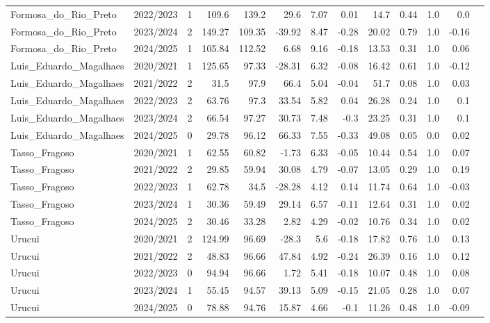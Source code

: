 \begin{longtable}{lrrrrrrrrrrrr}
Formosa_do_Rio_Preto & 2022/2023 & 1 & 109.6 & 139.2 & 29.6 & 7.07 & 0.01 & 14.7 & 0.44 & 1.0 & 0.0 \\ 
Formosa_do_Rio_Preto & 2023/2024 & 2 & 149.27 & 109.35 & -39.92 & 8.47 & -0.28 & 20.02 & 0.79 & 1.0 & -0.16 \\ 
Formosa_do_Rio_Preto & 2024/2025 & 1 & 105.84 & 112.52 & 6.68 & 9.16 & -0.18 & 13.53 & 0.31 & 1.0 & 0.06 \\ 
Luis_Eduardo_Magalhaes & 2020/2021 & 1 & 125.65 & 97.33 & -28.31 & 6.32 & -0.08 & 16.42 & 0.61 & 1.0 & -0.12 \\ 
Luis_Eduardo_Magalhaes & 2021/2022 & 2 & 31.5 & 97.9 & 66.4 & 5.04 & -0.04 & 51.7 & 0.08 & 1.0 & 0.03 \\ 
Luis_Eduardo_Magalhaes & 2022/2023 & 2 & 63.76 & 97.3 & 33.54 & 5.82 & 0.04 & 26.28 & 0.24 & 1.0 & 0.1 \\ 
Luis_Eduardo_Magalhaes & 2023/2024 & 2 & 66.54 & 97.27 & 30.73 & 7.48 & -0.3 & 23.25 & 0.31 & 1.0 & 0.1 \\ 
Luis_Eduardo_Magalhaes & 2024/2025 & 0 & 29.78 & 96.12 & 66.33 & 7.55 & -0.33 & 49.08 & 0.05 & 0.0 & 0.02 \\ 
Tasso_Fragoso & 2020/2021 & 1 & 62.55 & 60.82 & -1.73 & 6.33 & -0.05 & 10.44 & 0.54 & 1.0 & 0.07 \\ 
Tasso_Fragoso & 2021/2022 & 2 & 29.85 & 59.94 & 30.08 & 4.79 & -0.07 & 13.05 & 0.29 & 1.0 & 0.19 \\ 
Tasso_Fragoso & 2022/2023 & 1 & 62.78 & 34.5 & -28.28 & 4.12 & 0.14 & 11.74 & 0.64 & 1.0 & -0.03 \\ 
Tasso_Fragoso & 2023/2024 & 1 & 30.36 & 59.49 & 29.14 & 6.57 & -0.11 & 12.64 & 0.31 & 1.0 & 0.02 \\ 
Tasso_Fragoso & 2024/2025 & 2 & 30.46 & 33.28 & 2.82 & 4.29 & -0.02 & 10.76 & 0.34 & 1.0 & 0.02 \\ 
Urucui & 2020/2021 & 2 & 124.99 & 96.69 & -28.3 & 5.6 & -0.18 & 17.82 & 0.76 & 1.0 & 0.13 \\ 
Urucui & 2021/2022 & 2 & 48.83 & 96.66 & 47.84 & 4.92 & -0.24 & 26.39 & 0.16 & 1.0 & 0.12 \\ 
Urucui & 2022/2023 & 0 & 94.94 & 96.66 & 1.72 & 5.41 & -0.18 & 10.07 & 0.48 & 1.0 & 0.08 \\ 
Urucui & 2023/2024 & 1 & 55.45 & 94.57 & 39.13 & 5.09 & -0.15 & 21.05 & 0.28 & 1.0 & 0.07 \\ 
Urucui & 2024/2025 & 0 & 78.88 & 94.76 & 15.87 & 4.66 & -0.1 & 11.26 & 0.48 & 1.0 & -0.09 \\ 
\bottomrule
\end{longtable}
